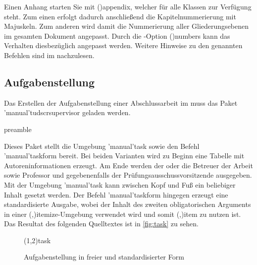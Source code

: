 \documentclass[%
  english,ngerman,%
  cdgeometry=no,DIV=12,%
  cd=false,cdfont=false,cdtitle=true,%
  headings=normal,%
  automark,%
  listof=toc,%
]{tudscrartcl}
\begin{document}
Einen Anhang starten Sie mit \Macro(){appendix}, welcher 
für alle Klassen zur Verfügung steht. Zum einen erfolgt dadurch anschließend 
die Kapitelnummerierung mit Majuskeln. Zum anderen wird damit die Nummerierung 
aller Gliederungsebenen im gesamten Dokument angepasst. Durch die 
\KOMAScript-Option \Option(){numbers} kann das Verhalten 
diesbezüglich angepasst werden. Weitere Hinweise zu den genannten Befehlen sind 
im \scrguide nachzulesen.


\subsection{%
  Aufgabenstellung%
  \label{sec:task}%
}

Das Erstellen der Aufgabenstellung einer Abschlussarbeit im \TUDCD muss 
das Paket \Package'manual'{tudscrsupervisor} geladen werden.
%
\begin{Code}{preamble}
\usepackage{tudscrsupervisor}

\end{Code}

Dieses Paket stellt die Umgebung \Environment'manual'{task} sowie den Befehl 
\Macro'manual'{taskform} bereit. Bei beiden Varianten wird zu Beginn eine 
Tabelle mit Autoreninformationen erzeugt. Am Ende werden der oder die Betreuer 
der Arbeit sowie Professor und gegebenenfalls der Prüfungsausschussvorsitzende 
ausgegeben. Mit der Umgebung \Environment'manual'{task} kann zwischen Kopf und 
Fuß ein beliebiger Inhalt gesetzt werden. Der Befehl \Macro'manual'{taskform} 
hingegen erzeugt eine standardisierte Ausgabe, wobei der Inhalt des zweiten 
obligatorischen Arguments in einer 
\Environment(,){itemize}-Umgebung 
verwendet wird und somit \Macro(,){item}
zu nutzen ist. Das Resultat des folgenden Quelltextes ist in \autoref{fig:task} 
zu sehen. 
%
\begin{figure}
\IncludeStandalone(1,2){task}
\caption{%
  Aufgabenstellung in freier und standardisierter Form%
  \label{fig:task}%
}
\end{figure}
\end{document}
